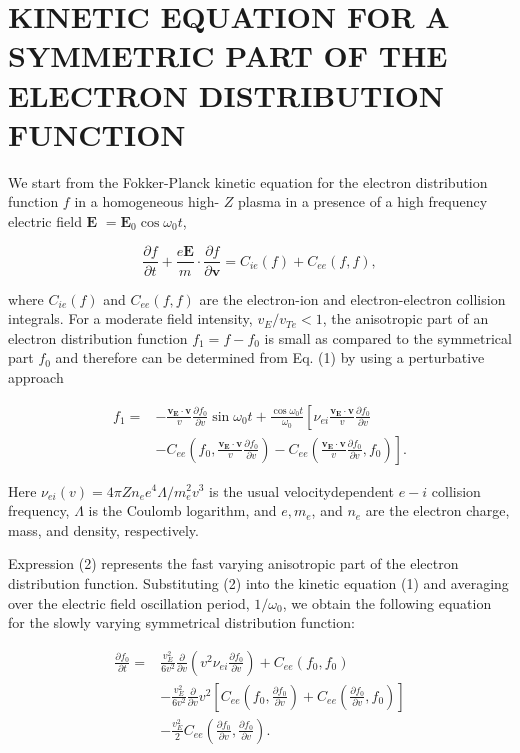 \documentclass[10pt]{article}
\begin{document}
\section{KINETIC EQUATION FOR A SYMMETRIC PART OF THE ELECTRON DISTRIBUTION FUNCTION}
We start from the Fokker-Planck kinetic equation for the electron distribution function $f$ in a homogeneous high- $Z$ plasma in a presence of a high frequency electric field $\mathbf{E}$ $=\mathbf{E}_{0} \cos \omega_{0} t$,

$$
\frac{\partial f}{\partial t}+\frac{e \mathbf{E}}{m} \cdot \frac{\partial f}{\partial \mathbf{v}}=C_{i e}(f)+C_{e e}(f, f),
$$

where $C_{i e}(f)$ and $C_{e e}(f, f)$ are the electron-ion and electron-electron collision integrals. For a moderate field intensity, $v_{E} / v_{T e}<1$, the anisotropic part of an electron distribution function $f_{1}=f-f_{0}$ is small as compared to the symmetrical part $f_{0}$ and therefore can be determined from Eq. (1) by using a perturbative approach

$$
\begin{aligned}
f_{1}= & -\frac{\mathbf{v}_{\mathbf{E}} \cdot \mathbf{v}}{v} \frac{\partial f_{0}}{\partial v} \sin \omega_{0} t+\frac{\cos \omega_{0} t}{\omega_{0}}\left[\nu_{e i} \frac{\mathbf{v}_{\mathbf{E}} \cdot \mathbf{v}}{v} \frac{\partial f_{0}}{\partial v}\right. \\
& \left.-C_{e e}\left(f_{0}, \frac{\mathbf{v}_{\mathbf{E}} \cdot \mathbf{v}}{v} \frac{\partial f_{0}}{\partial v}\right)-C_{e e}\left(\frac{\mathbf{v}_{\mathbf{E}} \cdot \mathbf{v}}{v} \frac{\partial f_{0}}{\partial v}, f_{0}\right)\right] .
\end{aligned}
$$

Here $\nu_{e i}(v)=4 \pi Z n_{e} e^{4} \Lambda / m_{e}^{2} v^{3}$ is the usual velocitydependent $e-i$ collision frequency, $\Lambda$ is the Coulomb logarithm, and $e, m_{e}$, and $n_{e}$ are the electron charge, mass, and density, respectively.

Expression (2) represents the fast varying anisotropic part of the electron distribution function. Substituting (2) into the kinetic equation (1) and averaging over the electric field oscillation period, $1 / \omega_{0}$, we obtain the following equation for the slowly varying symmetrical distribution function:

$$
\begin{aligned}
\frac{\partial f_{0}}{\partial t}= & \frac{v_{E}^{2}}{6 v^{2}} \frac{\partial}{\partial v}\left(v^{2} \nu_{e i} \frac{\partial f_{0}}{\partial v}\right)+C_{e e}\left(f_{0}, f_{0}\right) \\
& -\frac{v_{E}^{2}}{6 v^{2}} \frac{\partial}{\partial v} v^{2}\left[C_{e e}\left(f_{0}, \frac{\partial f_{0}}{\partial v}\right)+C_{e e}\left(\frac{\partial f_{0}}{\partial v}, f_{0}\right)\right] \\
& -\frac{v_{E}^{2}}{2} C_{e e}\left(\frac{\partial f_{0}}{\partial v}, \frac{\partial f_{0}}{\partial v}\right) .
\end{aligned}
$$
\end{document}
